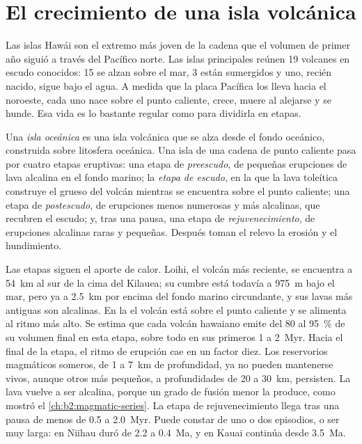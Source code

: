 \section{El crecimiento de una isla volcánica}\label{sec:b2:oceanic-islands:growth}

Las islas Hawái son el extremo más joven de la cadena que el volumen de primer año siguió a través del
Pacífico norte. Las islas principales reúnen 19 volcanes en escudo conocidos: 15 se alzan sobre el mar,
3 están sumergidos y uno, recién nacido, sigue bajo el agua. A medida que la placa Pacífica los lleva hacia el
noroeste, cada uno nace sobre el punto caliente, crece, muere al alejarse y se hunde. Esa vida es
lo bastante regular como para dividirla en etapas.

\begin{definition}\label{def:b2:oceanic-islands:stages}
Una \emph{isla oceánica} es una isla volcánica que se alza desde el fondo
oceánico, construida sobre litosfera oceánica. Una isla de una cadena de punto caliente pasa por cuatro etapas
eruptivas: una etapa de \emph{preescudo}, de pequeñas erupciones de lava alcalina en el fondo marino; la
\emph{etapa de escudo}, en la que la lava toleítica construye el grueso del volcán
mientras se encuentra sobre el punto caliente; una etapa de \emph{postescudo}, de erupciones menos numerosas y más alcalinas,
que recubren el escudo; y, tras una pausa, una etapa de \emph{rejuvenecimiento}, de erupciones alcalinas raras y
pequeñas. Después toman el relevo la erosión y el hundimiento.
\end{definition}

Las etapas siguen el aporte de calor. Loihi, el volcán más reciente, se encuentra a \qty{54}{km} al sur de la
cima del Kilauea; su cumbre está todavía a \qty{975}{m} bajo el mar, pero ya a \qty{2.5}{km} por encima del
fondo marino circundante, y sus lavas más antiguas son alcalinas. En la  el volcán está sobre
el punto caliente y se alimenta al ritmo más alto. Se estima que cada volcán hawaiano emite del 80 al
\qty{95}{\percent} de su volumen final en esta etapa, sobre todo en sus primeros 1 a \qty{2}{Myr}.
Hacia el final de la etapa, el ritmo de erupción cae en un factor diez. Los reservorios magmáticos someros, de 1
a \qty{7}{km} de profundidad, ya no pueden mantenerse vivos, aunque otros más pequeños, a profundidades de 20 a \qty{30}{km},
persisten. La lava vuelve a ser alcalina, porque un grado de fusión menor la produce, como mostró el
\cref{ch:b2:magmatic-series}. La etapa de rejuvenecimiento llega tras una pausa de menos de 0.5
a \qty{2.0}{Myr}. Puede constar de uno o dos episodios, o ser muy larga: en Niihau duró de 2.2 a
\qty{0.4}{Ma}, y en Kauai continúa desde \qty{3.5}{Ma}.

